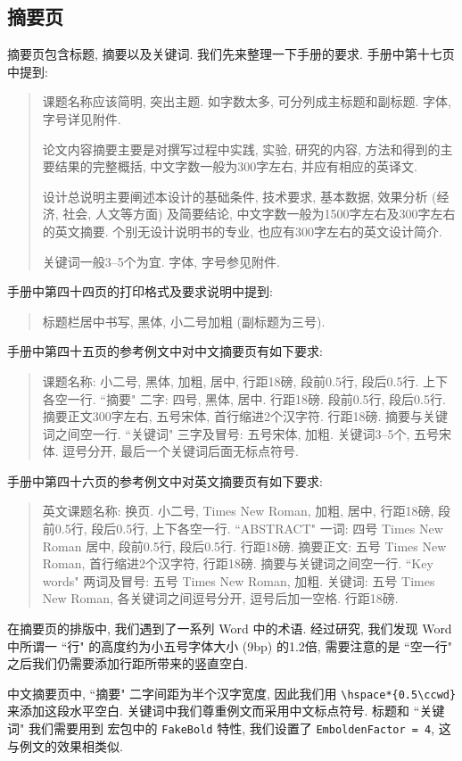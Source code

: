 \subsection{摘要页}

摘要页包含标题, 摘要以及关键词. 我们先来整理一下手册的要求. 手册中第十七页中提到:
\begin{quote}
  课题名称应该简明, 突出主题. 如字数太多, 可分列成主标题和副标题. 字体, 字号详见附件.

  论文内容摘要主要是对撰写过程中实践, 实验, 研究的内容, 方法和得到的主要结果的完整概括, 中文字数一般为300字左右, 并应有相应的英译文.

  设计总说明主要阐述本设计的基础条件, 技术要求, 基本数据, 效果分析 (经济, 社会, 人文等方面) 及简要结论, 中文字数一般为1500字左右及300字左右的英文摘要. 个别无设计说明书的专业, 也应有300字左右的英文设计简介.

  关键词一般3--5个为宜. 字体, 字号参见附件.
\end{quote}
手册中第四十四页的打印格式及要求说明中提到:
\begin{quote}
  标题栏居中书写, 黑体, 小二号加粗 (副标题为三号).
\end{quote}
手册中第四十五页的参考例文中对中文摘要页有如下要求:
\begin{quote}
  课题名称: 小二号, 黑体, 加粗, 居中, 行距18磅, 段前0.5行, 段后0.5行. 上下各空一行.
  ``摘要" 二字: 四号, 黑体, 居中. 行距18磅. 段前0.5行, 段后0.5行.
  摘要正文300字左右, 五号宋体, 首行缩进2个汉字符. 行距18磅.
  摘要与关键词之间空一行.
  ``关键词" 三字及冒号: 五号宋体, 加粗.
  关键词3--5个, 五号宋体. 逗号分开, 最后一个关键词后面无标点符号.
\end{quote}
手册中第四十六页的参考例文中对英文摘要页有如下要求:
\begin{quote}
  英文课题名称: 换页. 小二号, Times New Roman, 加粗, 居中, 行距18磅, 段前0.5行, 段后0.5行, 上下各空一行.
  ``ABSTRACT" 一词: 四号 Times New Roman 居中, 段前0.5行, 段后0.5行. 行距18磅.
  摘要正文: 五号 Times New Roman, 首行缩进2个汉字符, 行距18磅.
  摘要与关键词之间空一行.
  ``Key words" 两词及冒号: 五号 Times New Roman, 加粗.
  关键词: 五号 Times New Roman, 各关键词之间逗号分开, 逗号后加一空格. 行距18磅.
\end{quote}

在摘要页的排版中, 我们遇到了一系列 Word 中的术语. 经过研究, 我们发现 Word 中所谓一 ``行" 的高度约为小五号字体大小 (9bp) 的1.2倍, 需要注意的是 ``空一行" 之后我们仍需要添加行距所带来的竖直空白.

中文摘要页中, ``摘要" 二字间距为半个汉字宽度, 因此我们用 \verb|\hspace*{0.5\ccwd}| 来添加这段水平空白. 关键词中我们尊重例文而采用中文标点符号. 标题和 ``关键词" 我们需要用到  宏包中的 \verb|FakeBold| 特性, 我们设置了 \verb|EmboldenFactor = 4|, 这与例文的效果相类似.

